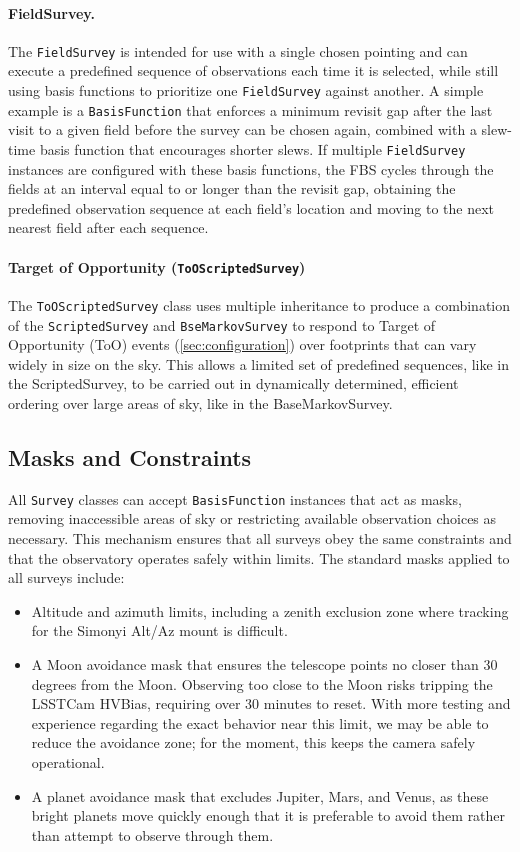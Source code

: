 \paragraph{FieldSurvey.}
The \texttt{FieldSurvey} is intended for use with a single chosen pointing and
can execute a predefined sequence of observations each time it is selected, while
still using basis functions to prioritize one \texttt{FieldSurvey} against
another. A simple example is a \texttt{BasisFunction} that enforces a minimum
revisit gap after the last visit to a given field before the survey can be chosen
again, combined with a slew-time basis function that encourages shorter slews. If
multiple \texttt{FieldSurvey} instances are configured with these basis
functions, the FBS cycles through the fields at an interval equal to or longer
than the revisit gap, obtaining the predefined observation sequence at each
field's location and moving to the next nearest field after each sequence.

\paragraph{Target of Opportunity (\texttt{ToOScriptedSurvey})}
The \texttt{ToOScriptedSurvey} class uses multiple inheritance to produce
a combination of the \texttt{ScriptedSurvey} and \texttt{BseMarkovSurvey} 
to respond to Target of Opportunity (ToO) events (\ref{sec:configuration}) over footprints that can vary
widely in size on the sky. This allows a limited set of predefined sequences, like in the ScriptedSurvey, to be 
carried out in dynamically determined, efficient ordering over large areas of sky, like in the BaseMarkovSurvey.


\subsection{Masks and Constraints}
\label{sec:masks}

All \texttt{Survey} classes can accept \texttt{BasisFunction} instances that act
as masks, removing inaccessible areas of sky or restricting available observation
choices as necessary. This mechanism ensures that all surveys obey the same
constraints and that the observatory operates safely within limits. The standard
masks applied to all surveys include:
%
\begin{itemize}
  \item Altitude and azimuth limits, including a zenith exclusion zone where
    tracking for the Simonyi Alt/Az mount is difficult.
  \item A Moon avoidance mask that ensures the telescope points no closer than
    30\,degrees from the Moon. Observing too close to the Moon risks tripping 
    the LSSTCam HVBias, requiring over 30 minutes to reset. With more testing 
    and experience regarding the exact behavior near this limit, we may be able to 
    reduce the avoidance zone; for the moment, this keeps the camera safely operational.
  \item A planet avoidance mask that excludes Jupiter, Mars, and Venus, as these
    bright planets move quickly enough that it is preferable to avoid them rather
    than attempt to observe through them.
\end{itemize}

